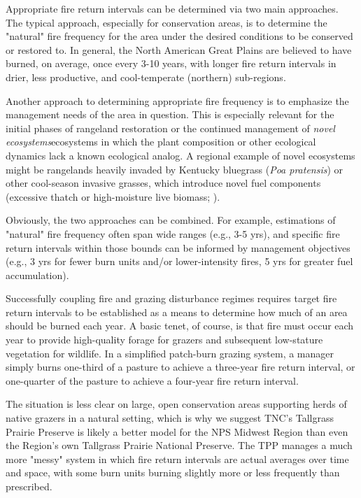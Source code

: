 Appropriate fire return intervals can be determined via two main approaches. 
The typical approach, especially for conservation areas, is to determine the "natural" fire frequency for the area under the desired conditions to be conserved or restored to. 
In general, the North American Great Plains are believed to have burned, on average, once every 3-10 years, with longer fire return intervals in drier, less productive, and cool-temperate (northern) sub-regions. 

Another approach to determining appropriate fire frequency is to emphasize the management needs of the area in question. 
This is especially relevant for the initial phases of rangeland restoration or the continued management of \emph{novel ecosystems}\textemdash ecosystems in which the plant composition or other ecological dynamics lack a known ecological analog. 
A regional example of novel ecosystems might be rangelands heavily invaded by Kentucky bluegrass (\emph{Poa pratensis}) or other cool-season invasive grasses, which introduce novel fuel components (excessive thatch or high-moisture live biomass; \citet{toledo2014a, mcgranahan2012a}). 

Obviously, the two approaches can be combined. 
For example, estimations of "natural" fire frequency often span wide ranges (e.g., 3-5 yrs), and specific fire return intervals within those bounds can be informed by management objectives (e.g., 3 yrs for fewer burn units and/or lower-intensity fires, 5 yrs for greater fuel accumulation). 

Successfully coupling fire and grazing disturbance regimes requires target fire return intervals to be established as a means to determine how much of an area should be burned each year. 
A basic tenet, of course, is that fire must occur each year to provide high-quality forage for grazers and subsequent low-stature vegetation for wildlife.
In a simplified patch-burn grazing system, a manager simply burns one-third of a pasture to achieve a three-year fire return interval, or one-quarter of the pasture to achieve a four-year fire return interval. 

The situation is less clear on large, open conservation areas supporting herds of native grazers in a natural setting, which is why we suggest TNC's Tallgrass Prairie Preserve is likely a better model for the NPS Midwest Region than even the Region's own Tallgrass Prairie National Preserve. 
The TPP manages a much more "messy" system in which fire return intervals are actual averages over time and space, with some burn units burning slightly more or less frequently than prescribed. 

